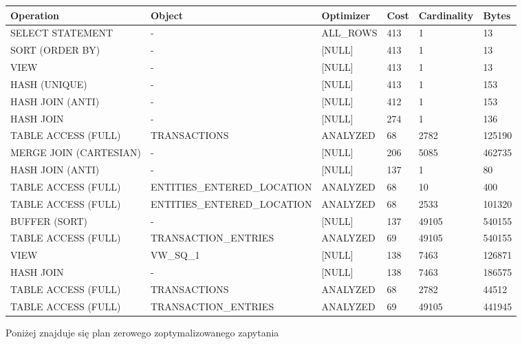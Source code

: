 \documentclass[11pt]{article}
\numberwithin{figure}{subsection}
\begin{document}
		\begin{tabularx}{\textwidth}{|X|X|X|X|X|X|}
Operation&Object&Optimizer&Cost&Cardinality&Bytes\\ \hline
SELECT STATEMENT& - &ALL\_ROWS&413&1&13\\ \hline
SORT (ORDER BY)& - &[NULL]&413&1&13\\ \hline
VIEW& - &[NULL]&413&1&13\\ \hline
HASH (UNIQUE)& - &[NULL]&413&1&153\\ \hline
HASH JOIN (ANTI)& - &[NULL]&412&1&153\\ \hline
HASH JOIN& - &[NULL]&274&1&136\\ \hline
TABLE ACCESS (FULL)&TRANSACTIONS&ANALYZED&68&2782&125190\\ \hline
MERGE JOIN (CARTESIAN)& - &[NULL]&206&5085&462735\\ \hline
HASH JOIN (ANTI)& - &[NULL]&137&1&80\\ \hline
TABLE ACCESS (FULL)&ENTITIES\_ENTERED\_LOCATION&ANALYZED&68&10&400\\ \hline
TABLE ACCESS (FULL)&ENTITIES\_ENTERED\_LOCATION&ANALYZED&68&2533&101320\\ \hline
BUFFER (SORT)& - &[NULL]&137&49105&540155\\ \hline
TABLE ACCESS (FULL)&TRANSACTION\_ENTRIES&ANALYZED&69&49105&540155\\ \hline
VIEW&VW\_SQ\_1&[NULL]&138&7463&126871\\ \hline
HASH JOIN& - &[NULL]&138&7463&186575\\ \hline
TABLE ACCESS (FULL)&TRANSACTIONS&ANALYZED&68&2782&44512\\ \hline
TABLE ACCESS (FULL)&TRANSACTION\_ENTRIES&ANALYZED&69&49105&441945\\ \hline
		\end{tabularx}
		
		Poniżej znajduje się plan zerowego zoptymalizowanego zapytania \\
		
\end{document}
